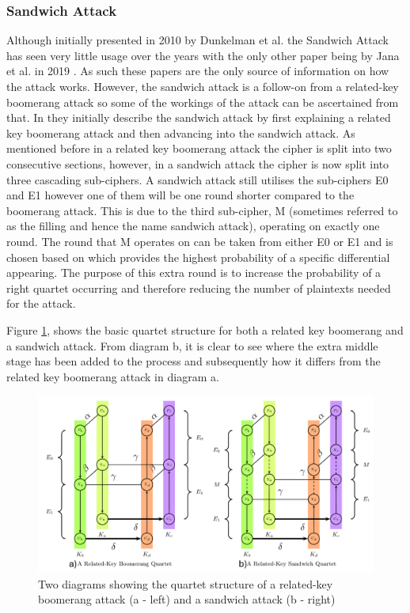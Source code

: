 \documentclass[10pt,journal,compsoc]{IEEEtran}
\begin{document}
\subsubsection{Sandwich Attack}
Although initially presented in 2010 by Dunkelman et al. \cite{C:DunKelSha10} the Sandwich Attack has seen very little usage over the years with the only other paper being by Jana et al. in 2019 \cite{DBLP:journals/iacr/JanaRSP23}. As such these papers are the only source of information on how the attack works. However, the sandwich attack is a follow-on from a related-key boomerang attack so some of the workings of the attack can be ascertained from that. In \cite{C:DunKelSha10} they initially describe the sandwich attack by first explaining a related key boomerang attack and then advancing into the sandwich attack. 
As mentioned before in a related key boomerang attack the cipher is split into two consecutive sections, however, in a sandwich attack the cipher is now split into three cascading sub-ciphers. A sandwich attack still utilises the sub-ciphers E0 and E1 however one of them will be one round shorter compared to the boomerang attack. This is due to the third sub-cipher, M (sometimes referred to as the filling and hence the name sandwich attack), operating on exactly one round. The round that M operates on can be taken from either E0 or E1 and is chosen based on which provides the highest probability of a specific differential appearing. The purpose of this extra round is to increase the probability of a right quartet occurring and therefore reducing the number of plaintexts needed for the attack.

Figure \ref{fig:boomsand}, shows the basic quartet structure for both a related key boomerang and a sandwich attack. From diagram b, it is clear to see where the extra middle stage has been added to the process and subsequently how it differs from the related key boomerang attack in diagram a. 

\begin{figure}
    \centering
    \includegraphics[width=\linewidth, keepaspectratio]{Figures/Boom_Sand_Diag.png}
    \caption{Two diagrams showing the quartet structure of a related-key boomerang attack (a - left) and a sandwich attack (b - right)\cite{C:DunKelSha10}}
    \label{fig:boomsand}
\end{figure}
\end{document}
